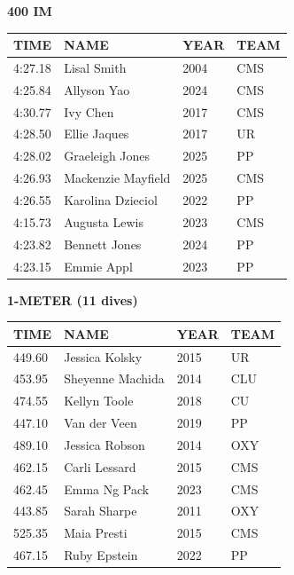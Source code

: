 \begin{table}[H]
\centering
\begin{minipage}[t]{0.6\textwidth}
\centering
\textbf{400 IM}\\[0.1cm]
\begin{tabular}{@{}p{1.8cm}p{2.8cm}p{1.2cm}p{1.4cm}@{}}
\hline
    \textbf{TIME} & \textbf{NAME} & \textbf{YEAR} & \textbf{TEAM} \\
\hline
    4:27.18 & Lisal Smith & 2004 & CMS \\
    4:25.84 & Allyson Yao & 2024 & CMS \\
    4:30.77 & Ivy Chen & 2017 & CMS \\
    4:28.50 & Ellie Jaques & 2017 & UR \\
    4:28.02 & Graeleigh Jones & 2025 & PP \\
    4:26.93 & Mackenzie Mayfield & 2025 & CMS \\
    4:26.55 & Karolina Dzieciol & 2022 & PP \\
    4:15.73 & Augusta Lewis & 2023 & CMS \\
    4:23.82 & Bennett Jones & 2024 & PP \\
    4:23.15 & Emmie Appl & 2023 & PP \\
\hline
\end{tabular}
\end{minipage}
\end{table}

\begin{table}[H]
\centering
\begin{minipage}[t]{0.6\textwidth}
\centering
\textbf{1-METER (11 dives)}\\[0.1cm]
\begin{tabular}{@{}p{1.8cm}p{2.8cm}p{1.2cm}p{1.4cm}@{}}
\hline
    \textbf{TIME} & \textbf{NAME} & \textbf{YEAR} & \textbf{TEAM} \\
\hline
    449.60 & Jessica Kolsky & 2015 & UR \\
    453.95 & Sheyenne Machida & 2014 & CLU \\
    474.55 & Kellyn Toole & 2018 & CU \\
    447.10 & Van der Veen & 2019 & PP \\
    489.10 & Jessica Robson & 2014 & OXY \\
    462.15 & Carli Lessard & 2015 & CMS \\
    462.45 & Emma Ng Pack & 2023 & CMS \\
    443.85 & Sarah Sharpe & 2011 & OXY \\
    525.35 & Maia Presti & 2015 & CMS \\
    467.15 & Ruby Epstein & 2022 & PP \\
\hline
\end{tabular}
\end{minipage}
\end{table}


